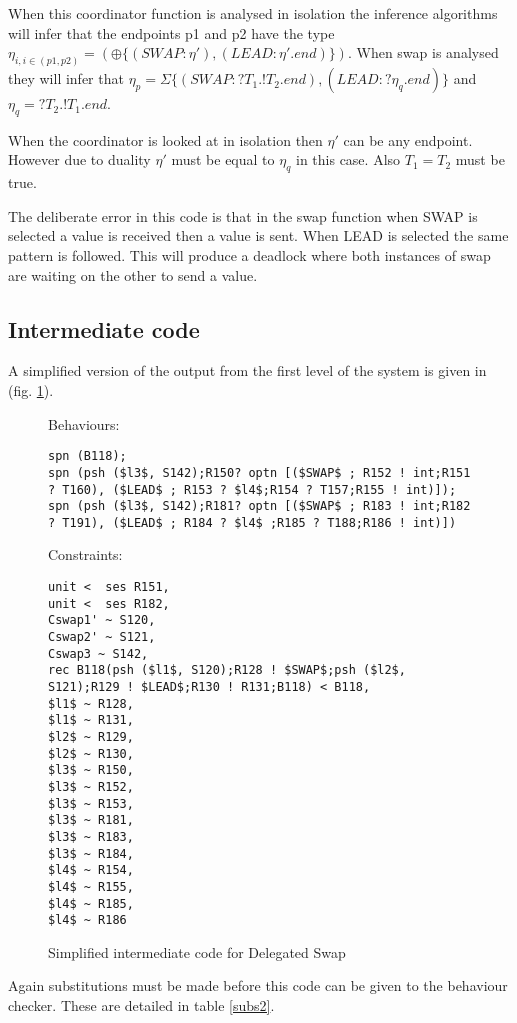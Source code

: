 When this coordinator function is analysed in isolation the inference algorithms will infer that the endpoints p1 and p2 have the type $\eta_{i, i \in (p1,p2)} = (\oplus \{(SWAP : \eta'), (LEAD : \eta'. end) \})$. When swap is analysed they will infer that $\eta_p = \Sigma\{(SWAP : ?T_1 .!T_2. end), (LEAD : ? \eta_q . end)\}$ and $\eta_q = ?T_2.!T_1.end$. 

When the coordinator is looked at in isolation then $\eta'$ can be any endpoint. However due to duality $\eta'$ must be equal to $\eta_q$ in this case. Also $T_1 = T_2$ must be true.

The deliberate error in this code is that in the swap function when SWAP is selected a value is received then a value is sent. When LEAD is selected the same pattern is followed. This will produce a deadlock where both instances of swap are waiting on the other to send a value. 

\subsection{Intermediate code}

A simplified version of the output from the first level of the system is given in (fig. \ref{delegInter}). 

\begin{figure}
Behaviours:
\begin{lstlisting}
spn (B118);
spn (psh ($l3$, S142);R150? optn [($SWAP$ ; R152 ! int;R151 ? T160), ($LEAD$ ; R153 ? $l4$;R154 ? T157;R155 ! int)]);
spn (psh ($l3$, S142);R181? optn [($SWAP$ ; R183 ! int;R182 ? T191), ($LEAD$ ; R184 ? $l4$ ;R185 ? T188;R186 ! int)])

\end{lstlisting}
Constraints:
\begin{lstlisting}
unit <  ses R151,
unit <  ses R182,
Cswap1' ~ S120,
Cswap2' ~ S121,
Cswap3 ~ S142,
rec B118(psh ($l1$, S120);R128 ! $SWAP$;psh ($l2$, S121);R129 ! $LEAD$;R130 ! R131;B118) < B118,
$l1$ ~ R128,
$l1$ ~ R131,
$l2$ ~ R129,
$l2$ ~ R130,
$l3$ ~ R150,
$l3$ ~ R152,
$l3$ ~ R153,
$l3$ ~ R181,
$l3$ ~ R183,
$l3$ ~ R184,
$l4$ ~ R154,
$l4$ ~ R155,
$l4$ ~ R185,
$l4$ ~ R186
\end{lstlisting}
\caption{Simplified intermediate code for Delegated Swap }
\label{delegInter}
\end{figure}

Again substitutions must be made before this code can be given to the behaviour checker. These are detailed in table \ref{subs2}.

